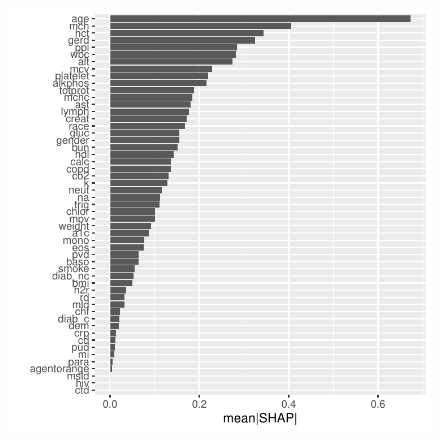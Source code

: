 \documentclass[12pt]{article}
\begin{document}
\begin{figure}[h]
\centering
\includegraphics[width=1.0\textwidth]{figures/shap_groups.pdf}
\end{figure}
\end{document}
